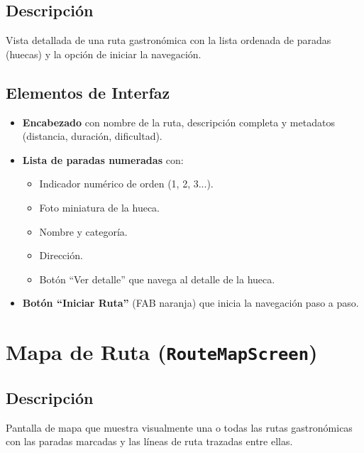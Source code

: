\documentclass[11pt, a4paper, oneside]{report}
\begin{document}
\subsection{Descripción}
Vista detallada de una ruta gastronómica con la lista ordenada de paradas (huecas) y la opción de iniciar la navegación.

\subsection{Elementos de Interfaz}
\begin{itemize}
  \item \textbf{Encabezado} con nombre de la ruta, descripción completa y metadatos (distancia, duración, dificultad).
  \item \textbf{Lista de paradas numeradas} con:
  \begin{itemize}
    \item Indicador numérico de orden (1, 2, 3...).
    \item Foto miniatura de la hueca.
    \item Nombre y categoría.
    \item Dirección.
    \item Botón ``Ver detalle'' que navega al detalle de la hueca.
  \end{itemize}
  \item \textbf{Botón ``Iniciar Ruta''} (FAB naranja) que inicia la navegación paso a paso.
\end{itemize}

\section{Mapa de Ruta (\texttt{RouteMapScreen})}

\subsection{Descripción}
Pantalla de mapa que muestra visualmente una o todas las rutas gastronómicas con las paradas marcadas y las líneas de ruta trazadas entre ellas.
\end{document}
